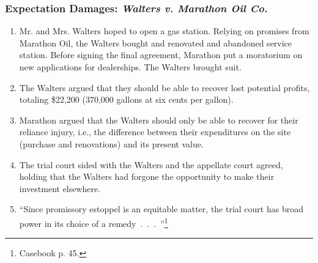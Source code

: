 \subsubsection{Expectation Damages: \emph{Walters v. Marathon Oil Co.}}

\begin{enumerate}
    \item Mr. and Mrs. Walters hoped to open a gas station. Relying on 
    promises from Marathon Oil, the Walters bought and renovated and abandoned 
    service station. Before signing the final agreement, Marathon put a 
    moratorium on new applications for dealerships. The Walters brought suit.
    \item The Walters argued that they should be able to recover lost 
    potential profits, totaling \$22,200 (370,000 gallons at six cents per 
    gallon).
    \item Marathon argued that the Walters should only be able to recover for 
    their reliance injury, i.e., the difference between their expenditures on 
    the site (purchase and renovations) and its present value.
    \item The trial court sided with the Walters and the appellate court 
    agreed, holding that the Walters had forgone the opportunity to make their 
    investment elsewhere.
    \item ``Since promissory estoppel is an equitable matter, the trial court 
    has broad power in its choice of a remedy~.~.~.~''\footnote{Casebook p. 
    45.}
\end{enumerate}


